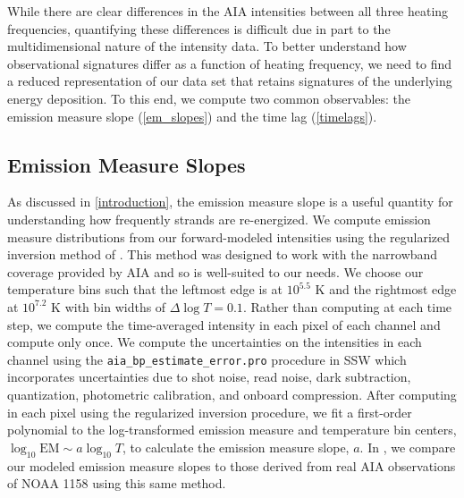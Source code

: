 While there are clear differences in the AIA intensities between all three heating frequencies, quantifying these differences is difficult due in part to the multidimensional nature of the intensity data. To better understand how observational signatures differ as a function of heating frequency, we need to find a reduced representation of our data set that retains signatures of the underlying energy deposition. To this end, we compute two common observables: the emission measure slope (\autoref{em_slopes}) and the time lag (\autoref{timelags}).

\subsection{Emission Measure Slopes}\label{em_slopes}

As discussed in \autoref{introduction}, the emission measure slope is a useful quantity for understanding how frequently strands are re-energized. We compute emission measure distributions from our forward-modeled intensities using the regularized inversion method of \citet{hannah_differential_2012}. This method was designed to work with the narrowband coverage provided by AIA and so is well-suited to our needs. We choose our temperature bins such that the leftmost edge is at $10^{5.5}$ K and the rightmost edge at $10^{7.2}$ K with bin widths of $\Delta\log T=0.1$. Rather than computing \dem{} at each time step, we compute the time-averaged intensity in each pixel of each channel and compute \dem{} only once. We compute the uncertainties on the intensities in each channel using the \texttt{aia\_bp\_estimate\_error.pro} procedure in SSW which incorporates uncertainties due to shot noise, read noise, dark subtraction, quantization, photometric calibration, and onboard compression. After computing \dem{} in each pixel using the regularized inversion procedure, we fit a first-order polynomial to the log-transformed emission measure and temperature bin centers, $\log_{10}\mathrm{EM}\sim a\log_{10}T$, to calculate the emission measure slope, $a$. In , we compare our modeled emission measure slopes to those derived from real AIA observations of NOAA 1158 using this same method.

